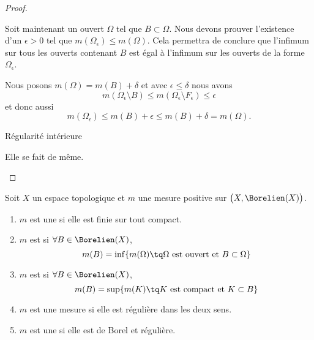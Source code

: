 \begin{proof}
\begin{subproof}
                Soit maintenant un ouvert \( \Omega\) tel que \( B\subset \Omega\). Nous devons prouver l'existence d'un \( \epsilon>0\) tel que \( m(\Omega_{\epsilon})\leq m(\Omega)\). Cela permettra de conclure que l'infimum sur tous les ouverts contenant \( B\) est égal à l'infimum sur les ouverts de la forme \( \Omega_{\epsilon}\).

                Nous posons \( m(\Omega)=m(B)+\delta\) et avec \( \epsilon\leq \delta\) nous avons
                \begin{equation}
                    m(\Omega_{\epsilon}\setminus B)\leq m(\Omega_{\epsilon}\setminus F_{\epsilon})\leq \epsilon
                \end{equation}
                et donc aussi
                \begin{equation}
                    m(\Omega_{\epsilon})\leq m(B)+\epsilon\leq m(B)+\delta=m(\Omega).
                \end{equation}
            \item[Régularité intérieure]

                Elle se fait de même.
    \end{subproof}
\end{proof}

\begin{definition}      \label{DefFMTEooMjbWKK}
    Soit \( X\) un espace topologique et \( m\) une mesure positive sur \( \big( X,\Borelien(X) \big)\).
    \begin{enumerate}
        \item       \label{ItemTTPTooStDcpw}
            \( m\) est une  si elle est finie sur tout compact.
        \item
            \( m\) est  si \( \forall B\in\Borelien(X)\), 
            \begin{equation}
                m(B)=\inf\{ m(\Omega)\tq\text{\( \Omega\) est ouvert et \( B\subset \Omega\)} \}
            \end{equation}
        \item
            \( m\) est  si \( \forall B\in\Borelien(X)\), 
            \begin{equation}
                m(B)=\sup\{ m(K)\tq\text{\(K\) est compact et \( K\subset B \)} \}
            \end{equation}
        \item
            \( m\) est une mesure  si elle est régulière dans les deux sens.
        \item
            \( m\) est une  si elle est de Borel et régulière.
    \end{enumerate}
\end{definition}

